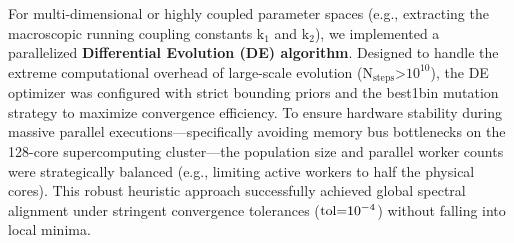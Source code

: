 \documentclass[fleqn,10pt]{wlscirep}
\begin{document}
For multi-dimensional or highly coupled parameter spaces (e.g.,
extracting the macroscopic running coupling constants
\(\text{k}_{\text{1}}\) and \(\text{k}_{\text{2}}\)), we implemented a
parallelized \textbf{Differential Evolution (DE) algorithm}. Designed to
handle the extreme computational overhead of large-scale evolution
(\(\text{N}_{\text{steps}}\text{>}\text{10}^{\text{10}}\)), the DE
optimizer was configured with strict bounding priors and the best1bin
mutation strategy to maximize convergence efficiency. To ensure hardware
stability during massive parallel executions---specifically avoiding
memory bus bottlenecks on the 128-core supercomputing cluster---the
population size and parallel worker counts were strategically balanced
(e.g., limiting active workers to half the physical cores). This robust
heuristic approach successfully achieved global spectral alignment under
stringent convergence tolerances (\(\text{tol=}\text{10}^{\text{\ensuremath{-}4}}\))
without falling into local minima.
\end{document}
